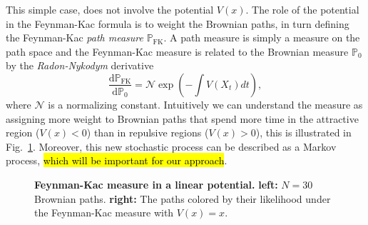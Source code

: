 This simple case, does not involve the potential $V(x)$. The role of the potential in the Feynman-Kac formula is to weight the Brownian paths, in turn defining the Feynman-Kac \emph{path measure} $\mathbb{P}_{\mathrm{FK}}$. A path measure is simply a measure on the path space and the Feynman-Kac measure is related to the Brownian measure $\mathbb{P}_{0}$ by the \emph{Radon-Nykodym} derivative
\begin{equation}
	\frac{\mathrm{d} \mathbb{P}_{\mathrm{FK}}}{\mathrm{d} \mathbb{P}_{0}}=\mathcal{N} \exp \left(-\int V\left(X_{t}\right) d t\right),
\end{equation}
where $\mathcal{N}$ is a normalizing constant. Intuitively we can understand the measure as assigning more weight to Brownian paths that spend more time in the attractive region ($V(x) < 0$) than in repulsive regions ($V(x) > 0$), this is illustrated in Fig.~\ref{fig:fkac_measure_reweight}. Moreover, this new stochastic process can be described as a Markov process, \hl{which will be important for our approach}.
\begin{figure}[H]
	\centering
	\caption[Feynman-Kac measure in a linear potential]{\textbf{Feynman-Kac measure in a linear potential.} 
	\textbf{left:} $N=30$ Brownian paths. \textbf{right:} The paths colored by their likelihood under the Feynman-Kac measure with $V(x)=x$. }
	\label{fig:fkac_measure_reweight}
\end{figure}

